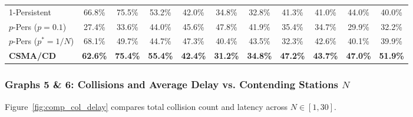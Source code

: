\documentclass[11pt,a4paper]{article}
\begin{document}
\begin{table}[H]
{\begin{tabular}{lcccccccccc}
1-Persistent & 66.8\% & 75.5\% & 53.2\% & 42.0\% & 34.8\% & 32.8\% & 41.3\% & 41.0\% & 44.0\% & 40.0\% \\
$p$-Pers ($p=0.1$) & 27.4\% & 33.6\% & 44.0\% & 45.6\% & 47.8\% & 41.9\% & 35.4\% & 34.7\% & 29.9\% & 32.2\% \\
$p$-Pers ($p^* = 1/N$) & 68.1\% & 49.7\% & 44.7\% & 47.3\% & 40.4\% & 43.5\% & 32.3\% & 42.6\% & 40.1\% & 39.9\% \\
\textbf{CSMA/CD} & \textbf{62.6\%} & \textbf{75.4\%} & \textbf{55.4\%} & \textbf{42.4\%} & \textbf{31.2\%} & \textbf{34.8\%} & \textbf{47.2\%} & \textbf{43.7\%} & \textbf{47.0\%} & \textbf{51.9\%} \\
\bottomrule
\end{tabular}%
}
\end{table}

\subsubsection{Graphs 5 \& 6: Collisions and Average Delay vs. Contending Stations $N$}
Figure~\ref{fig:comp_col_delay} compares total collision count and latency across $N \in [1, 30]$.
\end{document}
